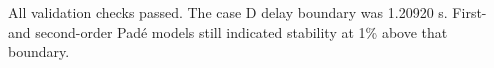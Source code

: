 All \ChecksPass{} validation checks passed. The case D delay boundary was
1.20920 s. First- and second-order Padé models still indicated stability at
1\% above that boundary.
